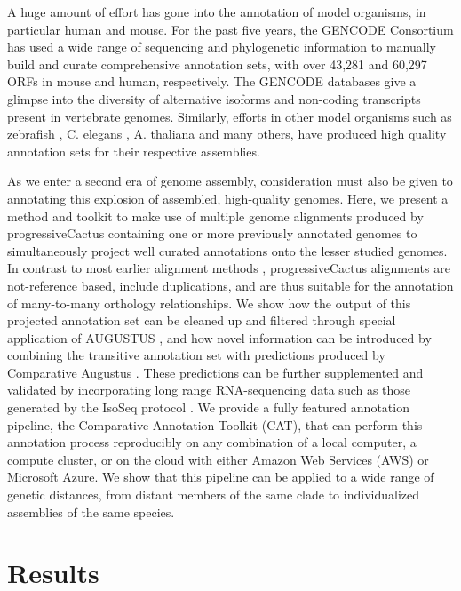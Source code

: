 \documentclass[fleqn,10pt]{wlscirep}
\begin{document}
A huge amount of effort has gone into the annotation of model organisms, in particular human and mouse. For the past five years, the GENCODE Consortium \cite{harrow2012gencode} has used a wide range of sequencing and phylogenetic information to manually build and curate comprehensive annotation sets, with over 43,281 and 60,297 ORFs in mouse and human, respectively. The GENCODE databases give a glimpse into the diversity of alternative isoforms and non-coding transcripts present in vertebrate genomes. Similarly, efforts in other model organisms such as zebrafish \cite{westerfield1998zebrafish}, C. elegans \cite{stein2001wormbase}, A. thaliana \cite{swarbreck2008arabidopsis} and many others, have produced high quality annotation sets for their respective assemblies.

As we enter a second era of genome assembly, consideration must also be given to annotating this explosion of assembled, high-quality genomes. Here, we present a method and toolkit to make use of multiple genome alignments produced by progressiveCactus \cite{paten2011cactus} containing one or more previously annotated genomes to simultaneously project well curated annotations onto the lesser studied genomes. In contrast to most earlier alignment methods \cite{blanchette2004aligning,earl2014alignathon,miller200728}, progressiveCactus alignments are not-reference based, include duplications, and are thus suitable for the annotation of many-to-many orthology relationships. We show how the output of this projected annotation set can be cleaned up and filtered through special application of AUGUSTUS \cite{stanke2008using}, and how novel information can be introduced by combining the transitive annotation set with predictions produced by Comparative Augustus \cite{konig2015simultaneous}. These predictions can be further supplemented and validated by incorporating long range RNA-sequencing data such as those generated by the IsoSeq protocol \cite{gordon2015widespread}. We provide a fully featured annotation pipeline, the Comparative Annotation Toolkit (CAT), that can perform this annotation process reproducibly on any combination of a local computer, a compute cluster, or on the cloud with either Amazon Web Services (AWS) or Microsoft Azure. We show that this pipeline can be applied to a wide range of genetic distances, from distant members of the same clade to individualized assemblies of the same species.


\section*{Results}
\end{document}
